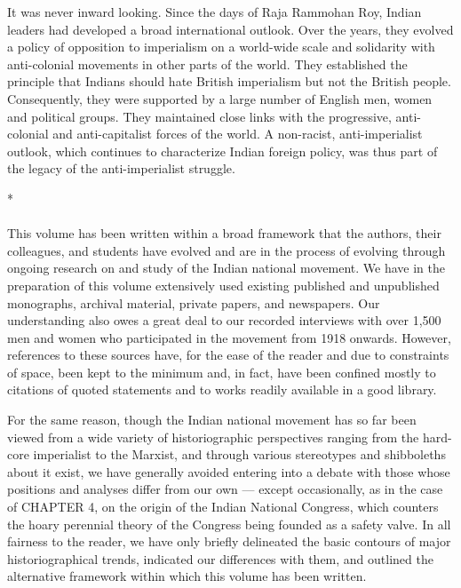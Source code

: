 It was never inward looking. Since the days of Raja Rammohan Roy, Indian leaders had developed a broad international outlook. Over the years, they evolved a policy of opposition to imperialism on a world-wide scale and solidarity with anti-colonial movements in other parts of the world. They established the principle that Indians should hate British imperialism but not the British people. Consequently, they were supported by a large number of English men, women and political groups. They maintained close links with the progressive, anti-colonial and anti-capitalist forces of the world. A non-racist, anti-imperialist outlook, which continues to characterize Indian foreign policy, was thus part of the legacy of the anti-imperialist struggle.

\begin{center}*\end{center}

\paragraph*{}
This volume has been written within a broad framework that the authors, their colleagues, and students have evolved and are in the process of evolving through ongoing research on and study of the Indian national movement. We have in the preparation of this volume extensively used existing published and unpublished monographs, archival material, private papers, and newspapers. Our understanding also owes a great deal to our recorded interviews with over 1,500 men and women who participated in the movement from 1918 onwards. However, references to these sources have, for the ease of the reader and due to constraints of space, been kept to the minimum and, in fact, have been confined mostly to citations of quoted statements and to works readily available in a good library.

For the same reason, though the Indian national movement has so far been viewed from a wide variety of historiographic perspectives ranging from the hard-core imperialist to the Marxist, and through various stereotypes and shibboleths about it exist, we have generally avoided entering into a debate with those whose positions and analyses differ from our own — except occasionally, as in the case of CHAPTER 4, on the origin of the Indian National Congress, which counters the hoary perennial theory of the Congress being founded as a safety valve. In all fairness to the reader, we have only briefly delineated the basic contours of major historiographical trends, indicated our differences with them, and outlined the alternative framework within which this volume has been written.

